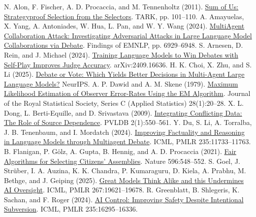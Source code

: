 \documentclass[12pt,letterpaper]{article}
\begin{document}
\clearpage
\begingroup
\small
\setlength{\bibsep}{3pt}
\begin{thebibliography}{}
\setlength{\itemsep}{2.5pt}
 N. Alon, F. Fischer, A. D. Procaccia, and M. Tennenholtz (2011). \href{https://doi.org/10.1145/2000378.2000390}{Sum of Us: Strategyproof Selection from the Selectors}. TARK, pp. 101--110.
 A. Amayuelas, X. Yang, A. Antoniades, W. Hua, L. Pan, and W. Y. Wang (2024). \href{https://arxiv.org/abs/2406.14711}{MultiAgent Collaboration Attack: Investigating Adversarial Attacks in Large Language Model Collaborations via Debate}. Findings of EMNLP, pp. 6929--6948.
 S. Arnesen, D. Rein, and J. Michael (2024). \href{https://arxiv.org/abs/2409.16636}{Training Language Models to Win Debates with Self-Play Improves Judge Accuracy}. arXiv:2409.16636.
 H. K. Choi, X. Zhu, and S. Li (2025). \href{https://arxiv.org/abs/2508.17536}{Debate or Vote: Which Yields Better Decisions in Multi-Agent Large Language Models?} NeurIPS.
 A. P. Dawid and A. M. Skene (1979). \href{https://doi.org/10.2307/2346806}{Maximum Likelihood Estimation of Observer Error-Rates Using the EM Algorithm}. Journal of the Royal Statistical Society, Series C (Applied Statistics) 28(1):20--28.
 X. L. Dong, L. Berti-Equille, and D. Srivastava (2009). \href{https://doi.org/10.14778/1687627.1687689}{Integrating Conflicting Data: The Role of Source Dependence}. PVLDB 2(1):550--561.
 Y. Du, S. Li, A. Torralba, J. B. Tenenbaum, and I. Mordatch (2024). \href{https://proceedings.mlr.press/v235/du24e.html}{Improving Factuality and Reasoning in Language Models through Multiagent Debate}. ICML, PMLR 235:11733--11763.
 B. Flanigan, P. G\"olz, A. Gupta, B. Hennig, and A. D. Procaccia (2021). \href{https://doi.org/10.1038/s41586-021-03788-6}{Fair Algorithms for Selecting Citizens' Assemblies}. Nature 596:548--552.
 S. Goel, J. Str\"uber, I. A. Auzina, K. K. Chandra, P. Kumaraguru, D. Kiela, A. Prabhu, M. Bethge, and J. Geiping (2025). \href{https://proceedings.mlr.press/v267/goel25b.html}{Great Models Think Alike and this Undermines AI Oversight}. ICML, PMLR 267:19621--19678.
 R. Greenblatt, B. Shlegeris, K. Sachan, and F. Roger (2024). \href{https://arxiv.org/abs/2312.06942}{AI Control: Improving Safety Despite Intentional Subversion}. ICML, PMLR 235:16295--16336.

\end{thebibliography}
\end{document}
